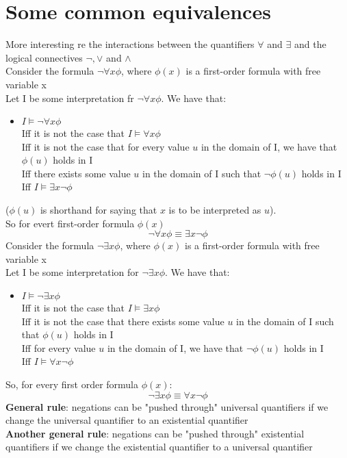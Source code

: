 \documentclass{article}[18pt]
\begin{document}
\section{Some common equivalences}
More interesting re the interactions between the quantifiers $\forall$ and $\exists$ and the logical connectives $\lnot, \lor$ and $\land$\\
Consider the formula $\lnot \forall x \phi$, where $\phi(x)$ is a first-order formula with free variable x\\
Let I be some interpretation fr $\lnot \forall x \phi$. We have that:
\begin{itemize}
	\item $I\models \lnot \forall x \phi$\\
	Iff it is not the case that $I\models \forall x \phi$\\
	Iff it is not the case that for every value $u$ in the domain of I, we have that $\phi(u)$ holds in I\\
	Iff there exists some value $u$ in the domain of I such that $\lnot \phi (u)$ holds in I\\
	Iff $I\models \exists x\lnot \phi$
\end{itemize}
($\phi(u)$ is shorthand for saying that $x$ is to be interpreted as $u$).\\
So for evert first-order formula $\phi(x)$
$$\lnot \forall x \phi \equiv \exists x \lnot \phi$$
Consider the formula $\lnot \exists x \phi$, where $\phi (x)$ is a first-order formula with free variable x\\
Let I be some interpretation for $\lnot \exists x \phi$. We have that:
\begin{itemize}
	\item $I\models \lnot \exists x \phi$\\
	Iff it is not the case that $I\models \exists x \phi$\\
	Iff it is not the case that there exists some value $u$ in the domain of I such that $\phi(u)$ holds in I\\
	Iff for every value $u$ in the domain of I, we have that $\lnot \phi(u)$ holds in I\\
	Iff $I\models \forall x \lnot \phi$
\end{itemize}
So, for every first order formula $\phi(x)$:
$$\lnot \exists x \phi\equiv \forall x \lnot \phi$$
\textbf{General rule}: negations can be "pushed through" universal quantifiers if we change the universal quantifier to an existential quantifier\\
\textbf{Another general rule}: negations can be "pushed through" existential quantifiers if we change the existential quantifier to a universal quantifier
\end{document}

